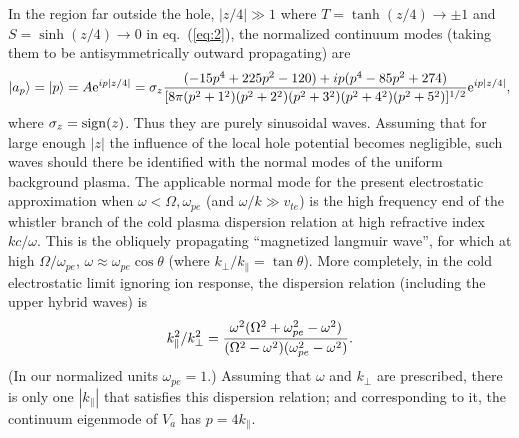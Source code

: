 \documentclass[12pt]{article}
\def\ket#1{|#1\rangle}
\def\etothe#1{{\rm e}^{#1}}
\begin{document}
In the region far outside the hole, $|z/4|\gg 1$ where
$T=\tanh(z/4)\to\pm1$ and $S=\sinh(z/4)\to0$ in eq.\ (\ref{eq:2}), the
normalized continuum modes (taking them to be antisymmetrically
outward propagating) are
\begin{equation}
  \label{eq:14}
 \ket{a_p}= \ket{p}=A\etothe{ip|z/4|}=\sigma_z{(-15p^4+225p^2-120) +ip (p^{4}-85p^{2}+274)\over
      [8\pi(p^2+1^2)(p^2+2^2)(p^2+3^2)(p^2+4^2)(p^2+5^2)]^{1/2}}\etothe{ip|z/4|},
\end{equation}
where $\sigma_z={\rm sign}(z)$. Thus they are purely sinusoidal
waves. Assuming that for large enough $|z|$ the influence of the local
hole potential becomes negligible, such waves should there be
identified with the normal modes of the uniform background plasma.
The applicable normal mode for the present electrostatic approximation
when $\omega<\Omega,\omega_{pe}$ (and $\omega/k\gg v_{te}$) is the high
frequency end of the whistler branch of the cold plasma dispersion
relation at high refractive index $kc/\omega$. This is the obliquely
propagating ``magnetized langmuir wave'', for which at high
$\Omega/\omega_{pe}$, 
$\omega\approx\omega_{pe}\cos\theta$ (where
$k_\perp/k_\parallel=\tan\theta$). More completely, in the cold
electrostatic limit ignoring ion response, the dispersion relation
(including the upper hybrid waves) is
\begin{equation}
  \label{eq:15}
  k_\parallel^2/k_\perp^2={\omega^2(\Omega^2+\omega_{pe}^2-\omega^2)
    \over(\Omega^2-\omega^2)(\omega_{pe}^2-\omega^2)}.
\end{equation}
(In our normalized units $\omega_{pe}=1$.)  Assuming that $\omega$ and
$k_\perp$ are prescribed, there is only one $|k_\parallel|$ that
satisfies this dispersion relation; and corresponding to it, the
continuum eigenmode of $V_a$ has $p=4k_\parallel$.
\end{document}
